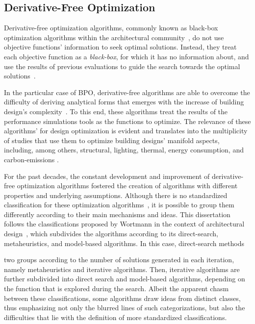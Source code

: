 	\subsection{Derivative-Free Optimization}
	\label{sec:dfo}
	 
	Derivative-free optimization algorithms, commonly known as black-box optimization algorithms within the architectural community~\cite{Wortmann2016BBO}, do not use objective functions' information to seek optimal solutions. Instead, they treat each objective function as a \textit{black-box}, for which it has no information about, and use the results of previous evaluations to guide the search towards the optimal solutions~\cite{Rios2013}.
	 
	In the particular case of \ac{BPO}, derivative-free algorithms are able to overcome the difficulty of deriving analytical forms that emerges with the increase of building design's complexity~\cite{Machairas2014}. To this end, these algorithms treat the results of the performance simulations tools as the functions to optimize. The relevance of these algorithms' for design optimization is evident and translates into the multiplicity of studies that use them to optimize building designs' manifold aspects, including, among others, structural, lighting, thermal, energy consumption, and carbon-emissions \cite{Evins2011,Evins2012MOO,Evins2013, Wortmann2015AdvSBO,Wortmann2016BBO,Wortmann2017GABESTCHOICE,Wortmann2017Opossum,Waibel2018}. 
	
	For the past decades, the constant development and improvement of derivative-free optimization algorithms fostered the creation of algorithms with different properties and underlying assumptions. Although there is no standardized classification for these optimization algorithms~\cite{Rios2013, Wortmann2017ADO}, it is possible to group them differently according to their main mechanisms and ideas. This dissertation follows the classifications proposed by Wortmann in the context of architectural design~\cite{Wortmann2015AdvSBO}, which subdivides the algorithms according to its direct-search, metaheuristics, and model-based algorithms. In this case, direct-search methods
	
	 two groups according to the number of solutions generated in each iteration, namely metaheuristics and iterative algorithms. Then, iterative algorithms are further subdivided into direct search and model-based algorithms, depending on the function that is explored during the search. Albeit the apparent chasm between these classifications, some algorithms draw ideas from distinct classes, thus emphasizing not only the blurred lines of such categorizations, but also the difficulties that lie with the definition of more standardized classifications. 
	

